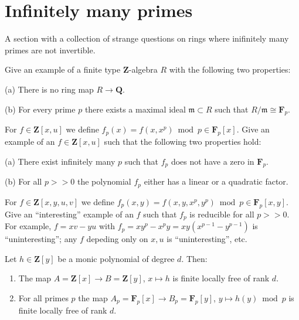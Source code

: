 \section{Infinitely many primes}
\label{section-many-primes}

\noindent
A section with a collection of strange questions on rings where
inifinitely many primes are not invertible.

\begin{exercise}
Give an example of a finite type ${\mathbf Z}$-algebra $R$
with the following two properties:
\item{(a)} There is no ring map $R \to {\mathbf Q}$.
\item{(b)} For every prime $p$ there exists a maximal ideal
${\mathfrak m} \subset R$ such that $R/{\mathfrak m} \cong {\mathbf F}_p$.
\end{exercise}

\begin{exercise}
For $f \in {\mathbf Z}[x,u]$ we define $f_p(x)
= f(x,x^p) \bmod p \in {\mathbf F}_p[x]$. Give an example
of an $f \in {\mathbf Z}[x,u]$ such that the following two
properties hold:
\item{(a)} There exist infinitely many $p$ such that $f_p$
does not have a zero in ${\mathbf F}_p$.
\item{(b)} For all $p>>0$ the polynomial $f_p$ either has
a linear or a quadratic factor.
\end{exercise}

\begin{exercise}
For $f \in {\mathbf Z}[x,y,u,v]$ we define $f_p(x,y)
= f(x,y,x^p,y^p) \bmod p \in {\mathbf F}_p[x,y]$. Give an ``interesting''
example of an $f$ such that $f_p$ is reducible for all $p>>0$.
For example, $f=xv-yu$ with $f_p=xy^p-x^py=xy(x^{p-1}-y^{p-1})$ is
``uninteresting''; any $f$ depeding only on $x,u$ is ``uninteresting'',
etc.
\end{exercise}

\begin{remark}
Let $h \in {\mathbf Z}[y]$ be a monic polynomial of degree $d$.
Then:
\begin{enumerate}
\item The map $A = {\mathbf Z}[x] \to B ={\mathbf Z}[y]$,
$x \mapsto h$ is finite locally free of rank $d$.
\item For all primes $p$ the map
$A_p = {\mathbf F}_p[x]\to B_p = {\mathbf F}_p[y]$,
$y \mapsto h(y) \bmod p$ is finite locally free of rank $d$.
\end{enumerate}
\end{remark}

